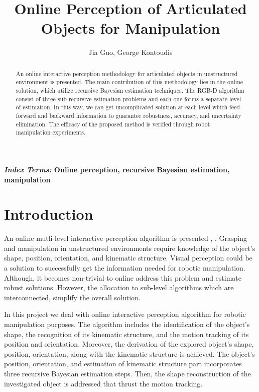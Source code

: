 \documentclass[letterpaper, 10 pt, conference]{ieeeconf}
\title{\LARGE \bf Online Perception of Articulated Objects for Manipulation}
\author{Jia Guo, George Kontoudis}
\begin{document}
\maketitle
\thispagestyle{empty}
\pagestyle{empty}

\begin{abstract}
An online interactive perception methodology for articulated objects in unstructured environment is presented. The main contribution of this methodology lies in the online solution, which utilize recursive Bayesian estimation techniques. The RGB-D algorithm consist of three sub-recursive estimation problems and each one forms a separate level of estimation. In this way, we can get uncomplicated solution at each level which feed forward and backward information to guarantee robustness, accuracy, and uncertainty elimination. The efficacy of the proposed method is verified through robot manipulation experiments.     
\end{abstract}

\normalsize{\bf\small\emph{Index Terms:} Online perception, recursive Bayesian estimation, manipulation}  

\section{Introduction}\label{intro}
An online mutli-level interactive perception algorithm is presented \cite{martin2014online}, \cite{martin2016integrated}. Grasping and manipulation in unstructured environments require knowledge of the object's shape, position, orientation, and kinematic structure. Visual perception could be a solution to successfully get the information needed for robotic manipulation. Although, it becomes non-trivial to online address this problem and estimate robust solutions. However, the allocation to sub-level algorithms which are interconnected, simplify the overall solution.

In this project we deal with online interactive perception algorithm for robotic manipulation purposes. The algorithm includes the identification of the object's shape, the recognition of its kinematic structure, and the motion tracking of its position and orientation. Moreover, the derivation of the explored object's shape, position, orientation, along with the kinematic structure is achieved. The object's position, orientation, and estimation of kinematic structure part incorporates three recursive Bayesian estimation steps. Then, the shape reconstruction of the investigated object is addressed that thrust the motion tracking.
\end{document}
